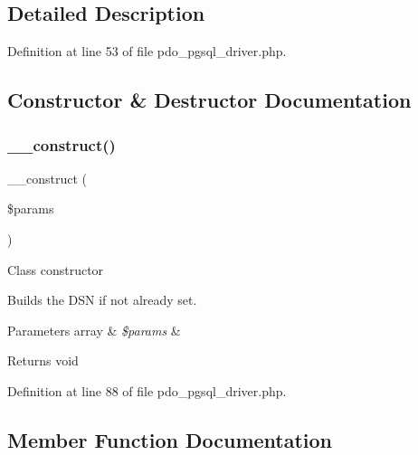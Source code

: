 \subsection{Detailed Description}


Definition at line 53 of file pdo\+\_\+pgsql\+\_\+driver.\+php.



\subsection{Constructor \& Destructor Documentation}
\mbox{\label{class_c_i___d_b__pdo__pgsql__driver_a9162320adff1a1a4afd7f2372f753a3e}} 
\subsubsection{\texorpdfstring{\_\_construct()}{\_\_construct()}}
{\footnotesize\ttfamily \+\_\+\+\_\+construct (\begin{DoxyParamCaption}\item[{}]{\$params }\end{DoxyParamCaption})}

Class constructor

Builds the D\+SN if not already set.


\begin{DoxyParams}[1]{Parameters}
array & {\em \$params} & \\
\hline
\end{DoxyParams}
\begin{DoxyReturn}{Returns}
void 
\end{DoxyReturn}


Definition at line 88 of file pdo\+\_\+pgsql\+\_\+driver.\+php.



\subsection{Member Function Documentation}
\mbox{\label{class_c_i___d_b__pdo__pgsql__driver_a133ea8446ded52589bd22cc9163d0896}} 
